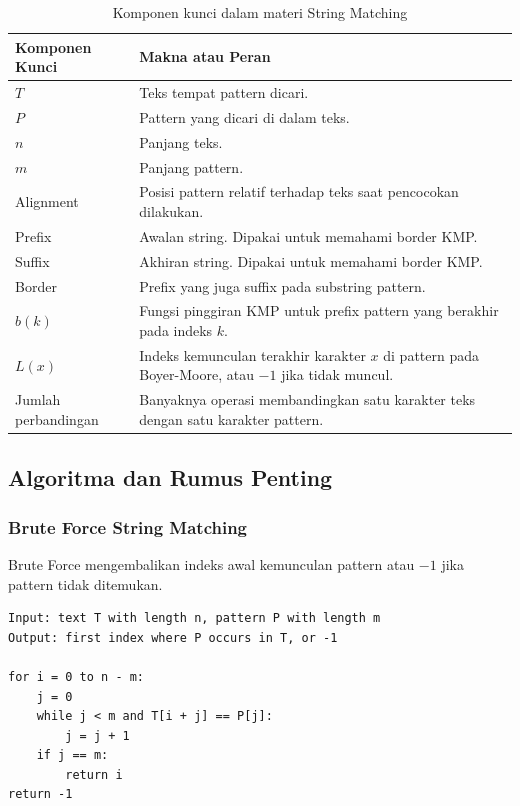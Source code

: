 \begin{table}[H]
\centering
\begin{tabularx}{\textwidth}{|L{0.28\textwidth}|X|}
\hline
\textbf{Komponen Kunci} & \textbf{Makna atau Peran} \\
\hline
$T$ & Teks tempat pattern dicari. \\
\hline
$P$ & Pattern yang dicari di dalam teks. \\
\hline
$n$ & Panjang teks. \\
\hline
$m$ & Panjang pattern. \\
\hline
Alignment & Posisi pattern relatif terhadap teks saat pencocokan dilakukan. \\
\hline
Prefix & Awalan string. Dipakai untuk memahami border KMP. \\
\hline
Suffix & Akhiran string. Dipakai untuk memahami border KMP. \\
\hline
Border & Prefix yang juga suffix pada substring pattern. \\
\hline
$b(k)$ & Fungsi pinggiran KMP untuk prefix pattern yang berakhir pada indeks $k$. \\
\hline
$L(x)$ & Indeks kemunculan terakhir karakter $x$ di pattern pada Boyer-Moore, atau $-1$ jika tidak muncul. \\
\hline
Jumlah perbandingan & Banyaknya operasi membandingkan satu karakter teks dengan satu karakter pattern. \\
\hline
\end{tabularx}
\caption{Komponen kunci dalam materi String Matching}
\label{tab:komponen-kunci-string-matching}
\end{table}

\subsection{Algoritma dan Rumus Penting}

\subsubsection{Brute Force String Matching}

\begin{jawab}
Brute Force mengembalikan indeks awal kemunculan pattern atau $-1$ jika pattern tidak ditemukan.
\end{jawab}

\begin{lstlisting}[caption={Pseudocode Brute Force String Matching}, label={lst:brute-string-matching}]
Input: text T with length n, pattern P with length m
Output: first index where P occurs in T, or -1

for i = 0 to n - m:
    j = 0
    while j < m and T[i + j] == P[j]:
        j = j + 1
    if j == m:
        return i
return -1
\end{lstlisting}

